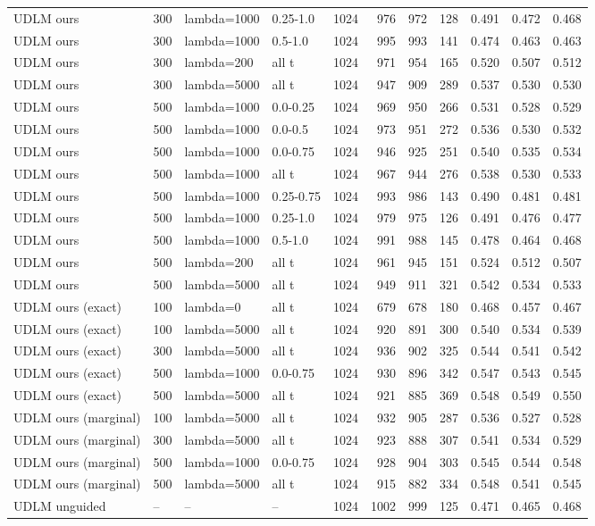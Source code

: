 \begin{tabular}{llllrrrrrrr}
UDLM ours & 300 & lambda=1000 & 0.25-1.0 & 1024 & 976 & 972 & 128 & 0.491 & 0.472 & 0.468 \\
UDLM ours & 300 & lambda=1000 & 0.5-1.0 & 1024 & 995 & 993 & 141 & 0.474 & 0.463 & 0.463 \\
UDLM ours & 300 & lambda=200 & all t & 1024 & 971 & 954 & 165 & 0.520 & 0.507 & 0.512 \\
UDLM ours & 300 & lambda=5000 & all t & 1024 & 947 & 909 & 289 & 0.537 & 0.530 & 0.530 \\
UDLM ours & 500 & lambda=1000 & 0.0-0.25 & 1024 & 969 & 950 & 266 & 0.531 & 0.528 & 0.529 \\
UDLM ours & 500 & lambda=1000 & 0.0-0.5 & 1024 & 973 & 951 & 272 & 0.536 & 0.530 & 0.532 \\
UDLM ours & 500 & lambda=1000 & 0.0-0.75 & 1024 & 946 & 925 & 251 & 0.540 & 0.535 & 0.534 \\
UDLM ours & 500 & lambda=1000 & all t & 1024 & 967 & 944 & 276 & 0.538 & 0.530 & 0.533 \\
UDLM ours & 500 & lambda=1000 & 0.25-0.75 & 1024 & 993 & 986 & 143 & 0.490 & 0.481 & 0.481 \\
UDLM ours & 500 & lambda=1000 & 0.25-1.0 & 1024 & 979 & 975 & 126 & 0.491 & 0.476 & 0.477 \\
UDLM ours & 500 & lambda=1000 & 0.5-1.0 & 1024 & 991 & 988 & 145 & 0.478 & 0.464 & 0.468 \\
UDLM ours & 500 & lambda=200 & all t & 1024 & 961 & 945 & 151 & 0.524 & 0.512 & 0.507 \\
UDLM ours & 500 & lambda=5000 & all t & 1024 & 949 & 911 & 321 & 0.542 & 0.534 & 0.533 \\
UDLM ours (exact) & 100 & lambda=0 & all t & 1024 & 679 & 678 & 180 & 0.468 & 0.457 & 0.467 \\
UDLM ours (exact) & 100 & lambda=5000 & all t & 1024 & 920 & 891 & 300 & 0.540 & 0.534 & 0.539 \\
UDLM ours (exact) & 300 & lambda=5000 & all t & 1024 & 936 & 902 & 325 & 0.544 & 0.541 & 0.542 \\
UDLM ours (exact) & 500 & lambda=1000 & 0.0-0.75 & 1024 & 930 & 896 & 342 & 0.547 & 0.543 & 0.545 \\
UDLM ours (exact) & 500 & lambda=5000 & all t & 1024 & 921 & 885 & 369 & 0.548 & 0.549 & 0.550 \\
UDLM ours (marginal) & 100 & lambda=5000 & all t & 1024 & 932 & 905 & 287 & 0.536 & 0.527 & 0.528 \\
UDLM ours (marginal) & 300 & lambda=5000 & all t & 1024 & 923 & 888 & 307 & 0.541 & 0.534 & 0.529 \\
UDLM ours (marginal) & 500 & lambda=1000 & 0.0-0.75 & 1024 & 928 & 904 & 303 & 0.545 & 0.544 & 0.548 \\
UDLM ours (marginal) & 500 & lambda=5000 & all t & 1024 & 915 & 882 & 334 & 0.548 & 0.541 & 0.545 \\
UDLM unguided & -- & -- & -- & 1024 & 1002 & 999 & 125 & 0.471 & 0.465 & 0.468 \\
\bottomrule
\end{tabular}
